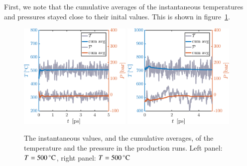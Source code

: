 First, we note that the cumulative averages of the instantaneous temperatures and pressures stayed close to their inital values. This is shown in figure~\ref{fig:prod}.

\begin{figure}[!ht]
\begin{center}
  \includegraphics[width=0.48\textwidth]{../figures/TP-prod-500} 
    \includegraphics[width=0.48\textwidth]{../figures/TP-prod-700} 
  \caption{The instantaneous values, and the cumulative averages, of the temperature and the pressure in the production runs. Left panel: $T=\unit[500]{^\circ C}$,  right panel: $T=\unit[500]{^\circ C}$}
  \label{fig:prod}
\end{center}
\end{figure}
